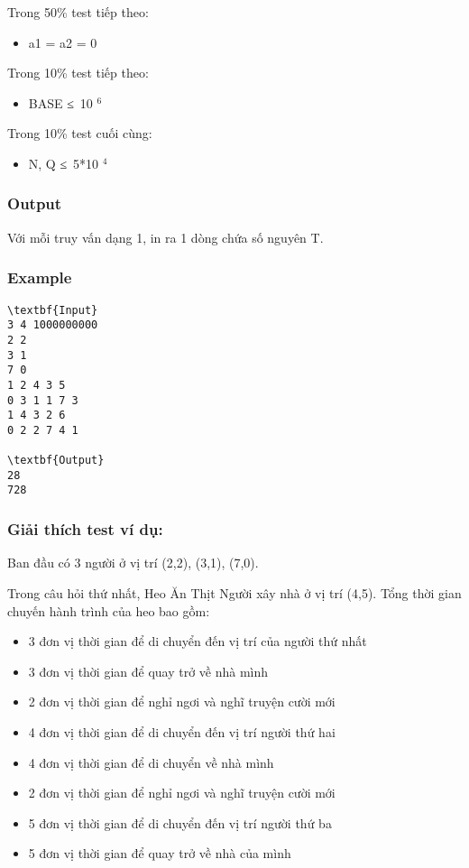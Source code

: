    Trong 50\% test tiếp theo:  
\begin{itemize}
	\item     a1 = a2 = 0   
\end{itemize}

   Trong 10\% test tiếp theo:  
\begin{itemize}
	\item     BASE ≤ 10    $^     6    $
\end{itemize}

   Trong 10\% test cuối cùng:  
\begin{itemize}
	\item     N, Q ≤ 5*10    $^     4    $
\end{itemize}

\subsubsection{   Output  }

   Với mỗi truy vấn dạng 1, in ra 1 dòng chứa số nguyên T.  

\subsubsection{   Example  }


\begin{verbatim}
\textbf{Input}
3 4 1000000000
2 2
3 1
7 0
1 2 4 3 5
0 3 1 1 7 3
1 4 3 2 6
0 2 2 7 4 1

\textbf{Output}
28
728\end{verbatim}

\subsubsection{   Giải thích test ví dụ:  }

   Ban đầu có 3 người ở vị trí (2,2), (3,1), (7,0).  

   Trong câu hỏi thứ nhất, Heo Ăn Thịt Người xây nhà ở vị trí (4,5). Tổng thời gian chuyến hành trình của heo bao gồm:  
\begin{itemize}
	\item     3 đơn vị thời gian để di chuyển đến vị trí của người thứ nhất   
	\item     3 đơn vị thời gian để quay trở về nhà mình   
	\item     2 đơn vị thời gian để nghỉ ngơi và nghĩ truyện cười mới   
	\item     4 đơn vị thời gian để di chuyển đến vị trí người thứ hai   
	\item     4 đơn vị thời gian để di chuyển về nhà mình   
	\item     2 đơn vị thời gian để nghỉ ngơi và nghĩ truyện cười mới   
	\item     5 đơn vị thời gian để di chuyển đến vị trí người thứ ba   
	\item     5 đơn vị thời gian để quay trở về nhà của mình   
\end{itemize}

